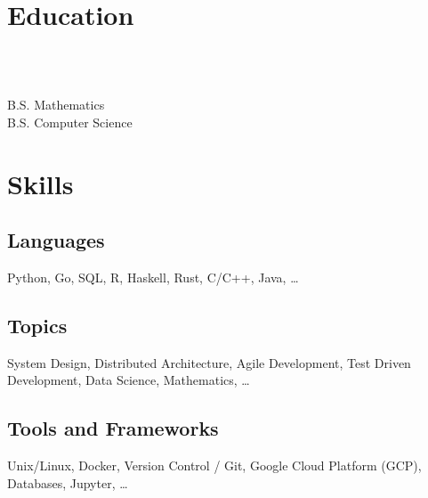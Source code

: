 \documentclass{tc_cv}
\begin{document}

\begin{minipage}[t]{0.3\linewidth}

  \vspace{1.5em}
  \section{Education}
  \\
  \date{Fall 2011 --- Spring 2016}\vspace{0.25em}\\
  \faGraduationCap \hspace{1ex} B.S. Mathematics\\
  \faGraduationCap \hspace{1ex} B.S. Computer Science

  \vspace{1.5em}
  \section{Skills}
  \subsection{Languages}
  Python,
  Go,
  SQL,
  R,
  Haskell,
  Rust,
  C/C++,
  Java,
  \ldots

  \vspace{0.25em}
  \subsection{Topics}
  System Design,
  Distributed Architecture,
  Agile Development,
  Test Driven Development,
  Data Science,
  Mathematics,
  \ldots

  \vspace{0.25em}
  \subsection{Tools and Frameworks}
  Unix/Linux,
  Docker,
  Version Control / Git,
  Google Cloud Platform (GCP),
  Databases,
  Jupyter,
  \ldots

  \vspace{0.25em}

\end{minipage}
\end{document}
